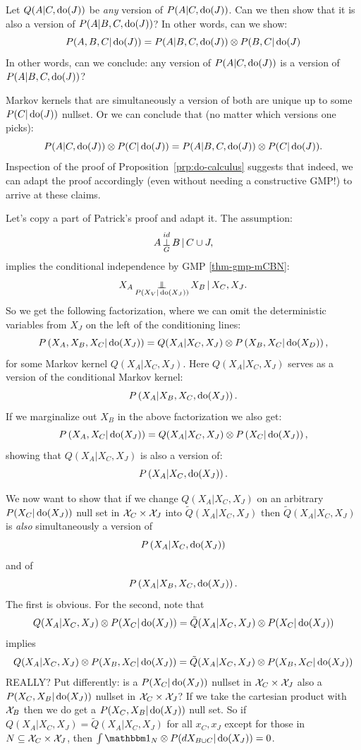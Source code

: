 {\begin{enumerate}
    Let $Q(A|C,\operatorname{do}(J))$ be \emph{any} version of $P(A|C,\operatorname{do}(J))$.
    Can we then show that it is also a version of $P(A|B,C,\operatorname{do}(J))$?
    In other words, can we show:
    $$P(A,B,C|\operatorname{do}(J)) = P(A|B,C,\operatorname{do}(J)) \otimes P(B,C|\operatorname{do}(J)$$
    In other words, can we conclude: any version of $P(A|C,\operatorname{do}(J))$ is a version of $P(A|B,C,\operatorname{do}(J))$?

    Markov kernels that are simultaneously a version of both are unique up to some $P(C|\operatorname{do}(J))$ nullset.
    Or we can conclude that (no matter which versions one picks):
    $$P(A|C,\operatorname{do}(J)) \otimes P(C|\operatorname{do}(J)) = P(A|B,C,\operatorname{do}(J)) \otimes P(C|\operatorname{do}(J)).$$
    Inspection of the proof of Proposition~\ref{prp:do-calculus} suggests that indeed, we can adapt the
    proof accordingly (even without needing a constructive GMP!) to arrive at these claims.

    Let's copy a part of Patrick's proof and adapt it.
    The assumption:
                \[ A \operatorname*{\perp}^{id}_{G} B \operatorname*{|} C \cup J,   \]
    implies the conditional independence by GMP \ref{thm-gmp-mCBN}:
      \[ X_A \operatorname*{\perp\mkern-11mu\perp}_{P(X_V|\operatorname{do}(X_J))} X_B \operatorname*{|} X_C,X_J.\]
    So  we get the following factorization, where we can omit the deterministic variables from $X_J$ on the left of the conditioning lines:
      \[ P\left ( X_A,X_B,X_C|\operatorname{do}(X_J)\right ) = Q(X_A|X_C,X_J) \otimes P\left ( X_B,X_C|\operatorname{do}(X_{D})\right ),\]
    for some Markov kernel $Q(X_A|X_C,X_J)$. Here
    $Q(X_A|X_C,X_J)$ serves as a version of the conditional Markov kernel:
      \[P\left ( X_A|X_B,X_C,\operatorname{do}(X_J)\right ).\]
    If we marginalize out $X_B$ in the above factorization we also get:
      \[ P\left ( X_A,X_C|\operatorname{do}(X_J)\right ) = Q(X_A|X_C,X_J) \otimes P\left ( X_C|\operatorname{do}(X_J)\right ),\]
    showing that $Q(X_A|X_C,X_J)$ is also a version of:
      \[P\left ( X_A|X_C,\operatorname{do}(X_J)\right ).\]

    We now want to show that if we change $Q(X_A|X_C,X_J)$ on an arbitrary $P(X_C|\operatorname{do}(X_J))$ null set in $\mathcal{X}_C \times \mathcal{X}_J$ into $\tilde Q(X_A|X_C,X_J)$
    then $\tilde Q(X_A|X_C,X_J)$ is \emph{also} simultaneously a version of 
      \[P\left ( X_A|X_C,\operatorname{do}(X_J)\right )\]
    and of
      \[P\left ( X_A|X_B,X_C,\operatorname{do}(X_J)\right ).\]
    The first is obvious. For the second, note that
    $$Q(X_A|X_C,X_J) \otimes P(X_C|\operatorname{do}(X_J)) = \tilde Q(X_A|X_C,X_J) \otimes P(X_C|\operatorname{do}(X_J))$$
    implies
    $$Q(X_A|X_C,X_J) \otimes P(X_B,X_C|\operatorname{do}(X_J)) = \tilde Q(X_A|X_C,X_J) \otimes P(X_B,X_C|\operatorname{do}(X_J))$$
    REALLY?
    Put differently: is a $P(X_C|\operatorname{do}(X_J))$ nullset in $\mathcal{X}_C \times \mathcal{X}_J$ also a $P(X_C,X_B|\operatorname{do}(X_J))$ nullset in $\mathcal{X}_C \times \mathcal{X}_J$?
    If we take the cartesian product with $\mathcal{X}_B$ then we do get a $P(X_C,X_B|\operatorname{do}(X_J))$ null set.
    So if $Q(X_A|X_C,X_J) = \tilde Q (X_A|X_C,X_J)$ for all $x_C,x_J$ except for those in $N \subseteq \mathcal{X}_C \times \mathcal{X}_J$,
    then $\int \I_N \otimes P(dX_{B\cup C}|\doit(X_J)) = 0$.


\end{enumerate}}
